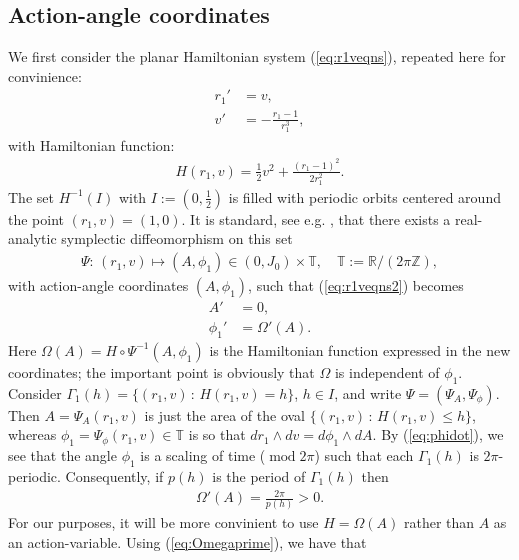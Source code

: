 \documentclass[reqno,12pt]{amsart}
\newcommand{\seclab}[1]{\label{sec:#1}}
\newcommand{\eqlab}[1]{\label{eq:#1}}
\renewcommand{\eqref}[1]{(\ref{eq:#1})}
\numberwithin{equation}{section}
\begin{document}
\subsection{Action-angle coordinates}\seclab{41}
We first consider the planar Hamiltonian system \eqref{r1veqns}, repeated here for convinience:
\begin{equation}\eqlab{r1veqns2}
\begin{aligned}
 r_1' &= v,\\
 v' &=-\frac{r_1-1}{r_1^3},
\end{aligned}
\end{equation}
with Hamiltonian function:
\begin{align*}
 H(r_1,v) = \frac12 v^2 +\frac{(r_1-1)^2}{2r_1^2}.
\end{align*}
The set $H^{-1}(I)$ with $I := \left(0,\frac12\right)$ is filled with periodic orbits centered around the point $(r_1,v)=(1,0)$. It is standard, see e.g. \cite{meyer2009a}, that there exists a real-analytic symplectic diffeomorphism on this set
\begin{align*}
 \Psi:\,(r_1,v)\mapsto (A,\phi_1)\in (0,J_0)\times \mathbb T,\quad \mathbb T:=\mathbb R/(2\pi \mathbb Z),
\end{align*}
with action-angle coordinates $(A,\phi_1)$, such that \eqref{r1veqns2} becomes
\begin{align}
 A' &=0,\nonumber \\
 \phi_1' &=\Omega'(A).\eqlab{phidot}
\end{align}
Here $\Omega(A)=H\circ \Psi^{-1}(A,\phi_1)$ is the Hamiltonian function expressed in the new coordinates;  the important point is obviously that $\Omega$ is independent of $\phi_1$. Consider $\Gamma_1(h)=\{(r_1,v)\,:\,H(r_1,v)=h\}$, $h\in I$,  and write $\Psi =(\Psi_A,\Psi_\phi)$. Then $A=\Psi_A(r_1,v)$ is just the area of the oval $\{(r_1,v)\,:\,H(r_1,v)\le h\}$, whereas $\phi_1=\Psi_\phi(r_1,v)\in \mathbb T$ is so that $dr_1\wedge dv=d\phi_1 \wedge dA$.
By \eqref{phidot}, we see that the angle $\phi_1$ is a scaling of time ($\operatorname{mod}2\pi$) such that each $\Gamma_1(h)$ is $2\pi$-periodic. Consequently, if $p(h)$ is the period of $\Gamma_1(h)$ then 
\begin{align}
  \Omega'(A) = \frac{2\pi}{p(h)}>0.\eqlab{Omegaprime}
\end{align}
For our purposes, it will be more convinient to use $H=\Omega(A)$ rather than $A$ as an action-variable. Using \eqref{Omegaprime}, we have that 
\end{document}
